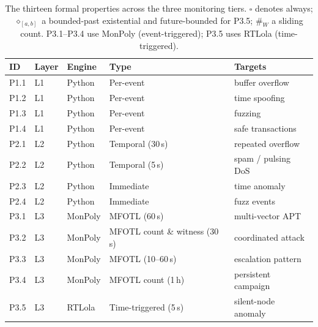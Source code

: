 \documentclass[runningheads]{llncs}
\begin{document}
\begin{table}[t]
\centering
\caption{The thirteen formal properties across the three
monitoring tiers.  $\square$ denotes always; $\diamond_{[a,b]}$
a bounded-past existential and future-bounded for P3.5; $\#_W$ a sliding count.  P3.1--P3.4
use MonPoly (event-triggered); P3.5 uses RTLola (time-triggered).}
\label{tab:properties}
\setlength{\tabcolsep}{4pt}
\renewcommand{\arraystretch}{1.1}
\footnotesize
\begin{tabular}{@{}lllll@{}}
\toprule
\textbf{ID} & \textbf{Layer} & \textbf{Engine} & \textbf{Type} & \textbf{Targets} \\
\midrule
P1.1  & L1 & Python    & Per-event       & buffer overflow \\
P1.2  & L1 & Python    & Per-event       & time spoofing  \\
P1.3  & L1 & Python    & Per-event       & fuzzing \\
P1.4  & L1 & Python    & Per-event       & safe transactions \\
\midrule
P2.1  & L2 & Python    & Temporal (30\,s) & repeated overflow \\
P2.2  & L2 & Python    & Temporal (5\,s)  & spam / pulsing DoS \\
P2.3  & L2 & Python    & Immediate       & time anomaly \\
P2.4  & L2 & Python    & Immediate       & fuzz events \\
\midrule
P3.1  & L3 & MonPoly   & MFOTL (60\,s)   & multi-vector APT \\
P3.2  & L3 & MonPoly   & MFOTL count \& witness (30\,s) & coordinated attack \\
P3.3  & L3 & MonPoly   & MFOTL (10--60\,s) & escalation pattern \\
P3.4  & L3 & MonPoly   & MFOTL count (1\,h) & persistent campaign \\
P3.5  & L3 & RTLola    & Time-triggered (5\,s) & silent-node anomaly \\
\bottomrule
\end{tabular}
\end{table}
\end{document}
